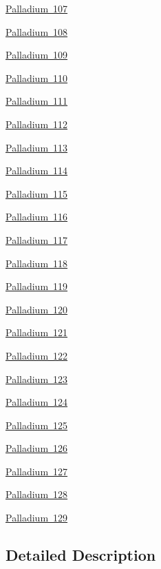 \begin{DoxyCompactItemize}
\mbox{\hyperlink{group___isotope_const-_palladium-_pd107}{Palladium 107}}
\item 
\mbox{\hyperlink{group___isotope_const-_palladium-_pd108}{Palladium 108}}
\item 
\mbox{\hyperlink{group___isotope_const-_palladium-_pd109}{Palladium 109}}
\item 
\mbox{\hyperlink{group___isotope_const-_palladium-_pd110}{Palladium 110}}
\item 
\mbox{\hyperlink{group___isotope_const-_palladium-_pd111}{Palladium 111}}
\item 
\mbox{\hyperlink{group___isotope_const-_palladium-_pd112}{Palladium 112}}
\item 
\mbox{\hyperlink{group___isotope_const-_palladium-_pd113}{Palladium 113}}
\item 
\mbox{\hyperlink{group___isotope_const-_palladium-_pd114}{Palladium 114}}
\item 
\mbox{\hyperlink{group___isotope_const-_palladium-_pd115}{Palladium 115}}
\item 
\mbox{\hyperlink{group___isotope_const-_palladium-_pd116}{Palladium 116}}
\item 
\mbox{\hyperlink{group___isotope_const-_palladium-_pd117}{Palladium 117}}
\item 
\mbox{\hyperlink{group___isotope_const-_palladium-_pd118}{Palladium 118}}
\item 
\mbox{\hyperlink{group___isotope_const-_palladium-_pd119}{Palladium 119}}
\item 
\mbox{\hyperlink{group___isotope_const-_palladium-_pd120}{Palladium 120}}
\item 
\mbox{\hyperlink{group___isotope_const-_palladium-_pd121}{Palladium 121}}
\item 
\mbox{\hyperlink{group___isotope_const-_palladium-_pd122}{Palladium 122}}
\item 
\mbox{\hyperlink{group___isotope_const-_palladium-_pd123}{Palladium 123}}
\item 
\mbox{\hyperlink{group___isotope_const-_palladium-_pd124}{Palladium 124}}
\item 
\mbox{\hyperlink{group___isotope_const-_palladium-_pd125}{Palladium 125}}
\item 
\mbox{\hyperlink{group___isotope_const-_palladium-_pd126}{Palladium 126}}
\item 
\mbox{\hyperlink{group___isotope_const-_palladium-_pd127}{Palladium 127}}
\item 
\mbox{\hyperlink{group___isotope_const-_palladium-_pd128}{Palladium 128}}
\item 
\mbox{\hyperlink{group___isotope_const-_palladium-_pd129}{Palladium 129}}
\end{DoxyCompactItemize}


\subsection{Detailed Description}
